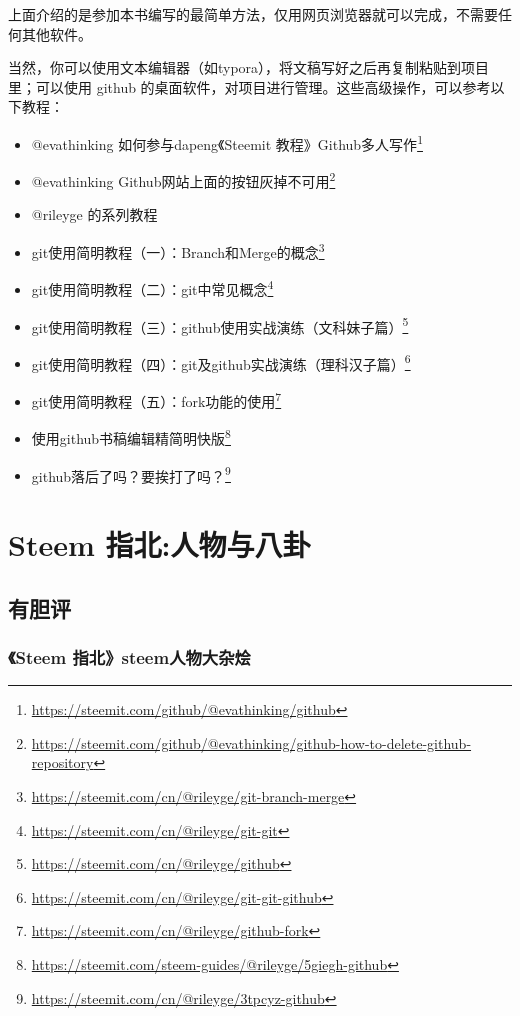 \documentclass[]{ctexbook}
\providecommand{\tightlist}{%
  \setlength{\itemsep}{0pt}\setlength{\parskip}{0pt}}
\renewcommand{\href}[2]{#2\footnote{\url{#1}}}
\begin{document}
上面介绍的是参加本书编写的最简单方法，仅用网页浏览器就可以完成，不需要任何其他软件。

当然，你可以使用文本编辑器（如typora），将文稿写好之后再复制粘贴到项目里；可以使用 github 的桌面软件，对项目进行管理。这些高级操作，可以参考以下教程：

\begin{itemize}
\tightlist
\item
  @evathinking \href{https://steemit.com/github/@evathinking/github}{如何参与dapeng《Steemit 教程》Github多人写作}
\item
  @evathinking \href{https://steemit.com/github/@evathinking/github-how-to-delete-github-repository}{Github网站上面的按钮灰掉不可用}
\item
  @rileyge 的系列教程
\item
  \href{https://steemit.com/cn/@rileyge/git-branch-merge}{git使用简明教程（一）：Branch和Merge的概念}
\item
  \href{https://steemit.com/cn/@rileyge/git-git}{git使用简明教程（二）：git中常见概念}
\item
  \href{https://steemit.com/cn/@rileyge/github}{git使用简明教程（三）：github使用实战演练（文科妹子篇）}
\item
  \href{https://steemit.com/cn/@rileyge/git-git-github}{git使用简明教程（四）：git及github实战演练（理科汉子篇）}
\item
  \href{https://steemit.com/cn/@rileyge/github-fork}{git使用简明教程（五）：fork功能的使用}
\item
  \href{https://steemit.com/steem-guides/@rileyge/5giegh-github}{使用github书稿编辑精简明快版}
\item
  \href{https://steemit.com/cn/@rileyge/3tpcyz-github}{github落后了吗？要挨打了吗？}
\end{itemize}

\hypertarget{fl}{%
\chapter{Steem 指北:人物与八卦}\label{fl}}

\section{有胆评}

\hypertarget{steem-steem}{%
\subsection{《Steem 指北》steem人物大杂烩}\label{steem-steem}}
\end{document}

